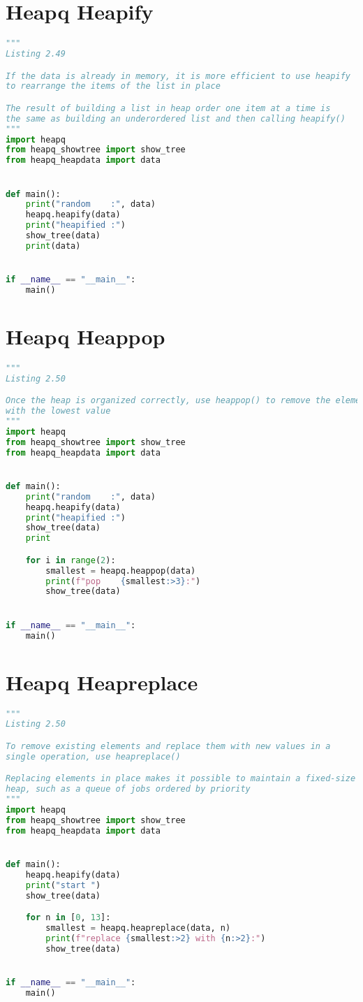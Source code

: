 \documentclass[a4paper,landscape]{report}
\begin{document}
\section{Heapq Heapify}
\begin{lstlisting}[language=Python]
"""
Listing 2.49

If the data is already in memory, it is more efficient to use heapify
to rearrange the items of the list in place

The result of building a list in heap order one item at a time is
the same as building an underordered list and then calling heapify()
"""
import heapq
from heapq_showtree import show_tree
from heapq_heapdata import data


def main():
    print("random    :", data)
    heapq.heapify(data)
    print("heapified :")
    show_tree(data)
    print(data)


if __name__ == "__main__":
    main()

\end{lstlisting}
\section{Heapq Heappop}
\begin{lstlisting}[language=Python]
"""
Listing 2.50

Once the heap is organized correctly, use heappop() to remove the element
with the lowest value
"""
import heapq
from heapq_showtree import show_tree
from heapq_heapdata import data


def main():
    print("random    :", data)
    heapq.heapify(data)
    print("heapified :")
    show_tree(data)
    print

    for i in range(2):
        smallest = heapq.heappop(data)
        print(f"pop    {smallest:>3}:")
        show_tree(data)


if __name__ == "__main__":
    main()

\end{lstlisting}
\section{Heapq Heapreplace}
\begin{lstlisting}[language=Python]
"""
Listing 2.50

To remove existing elements and replace them with new values in a
single operation, use heapreplace()

Replacing elements in place makes it possible to maintain a fixed-size
heap, such as a queue of jobs ordered by priority
"""
import heapq
from heapq_showtree import show_tree
from heapq_heapdata import data


def main():
    heapq.heapify(data)
    print("start ")
    show_tree(data)

    for n in [0, 13]:
        smallest = heapq.heapreplace(data, n)
        print(f"replace {smallest:>2} with {n:>2}:")
        show_tree(data)


if __name__ == "__main__":
    main()

\end{lstlisting}
\end{document}
